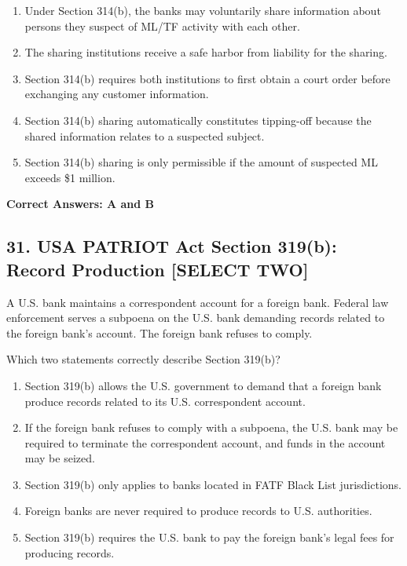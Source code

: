 \documentclass[11pt,a4paper]{article}
\begin{document}
	\begin{enumerate}[label=\Alph*.]
		\item Under Section 314(b), the banks may voluntarily share information about persons they suspect of ML/TF activity with each other.
		\item The sharing institutions receive a safe harbor from liability for the sharing.
		\item Section 314(b) requires both institutions to first obtain a court order before exchanging any customer information.
		\item Section 314(b) sharing automatically constitutes tipping-off because the shared information relates to a suspected subject.
		\item Section 314(b) sharing is only permissible if the amount of suspected ML exceeds \$1 million.
	\end{enumerate}
	
	\textbf{Correct Answers: A and B}
	
	\subsection{31. USA PATRIOT Act Section 319(b): Record Production \textnormal{[SELECT TWO]}}
	
	A U.S. bank maintains a correspondent account for a foreign bank. Federal law enforcement serves a subpoena on the U.S. bank demanding records related to the foreign bank's account. The foreign bank refuses to comply.
	
	Which two statements correctly describe Section 319(b)?
	
	\begin{enumerate}[label=\Alph*.]
		\item Section 319(b) allows the U.S. government to demand that a foreign bank produce records related to its U.S. correspondent account.
		\item If the foreign bank refuses to comply with a subpoena, the U.S. bank may be required to terminate the correspondent account, and funds in the account may be seized.
		\item Section 319(b) only applies to banks located in FATF Black List jurisdictions.
		\item Foreign banks are never required to produce records to U.S. authorities.
		\item Section 319(b) requires the U.S. bank to pay the foreign bank's legal fees for producing records.
	\end{enumerate}
	
\end{document}
